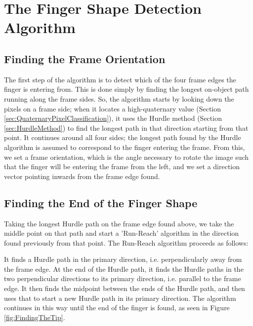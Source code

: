 \section{The Finger Shape Detection Algorithm}\label{sec:FingerShapeDetectionAlgorithm}


\subsection{Finding the Frame Orientation}\label{sec:FindingTheFrameOrientation}
The first step of the algorithm is to detect which of the four frame edges the finger is entering from. This is done simply by finding the longest on-object path running along the frame sides. So, the algorithm starts by looking down the pixels on a frame side; when it locates a high-quaternary value (Section \ref{sec:QuaternaryPixelClassification}), it uses the Hurdle method (Section \ref{sec:HurdleMethod}) to find the longest path in that direction starting from that point. It continues around all four sides; the longest path found by the Hurdle algorithm is assumed to correspond to the finger entering the frame. From this, we set a frame orientation, which is the angle necessary to rotate the image such that the finger will be entering the frame from the left, and we set a direction vector pointing inwards from the frame edge found.

\subsection{Finding the End of the Finger Shape}\label{sec:FindingTheEndOfTheFingerShape}
Taking the longest Hurdle path on the frame edge found above, we take the middle point on that path and start a 'Run-Reach' algorithm in the direction found previously from that point. The Run-Reach algorithm proceeds as follows:

It finds a Hurdle path in the primary direction, i.e. perpendicularly away from the frame edge. At the end of the Hurdle path, it finds the Hurdle paths in the two perpendicular directions to its primary direction, i.e. parallel to the frame edge. It then finds the midpoint between the ends of the Hurdle path, and then uses that to start a new Hurdle path in its primary direction. The algorithm continues in this way until the end of the finger is found, as seen in Figure \ref{fig:FindingTheTip}.


